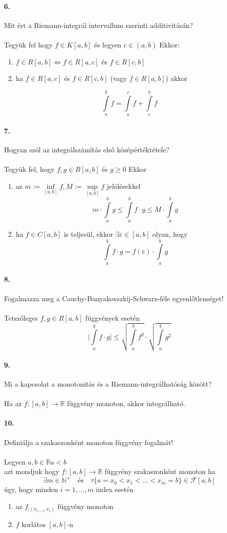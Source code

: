 \documentclass[10pt,a4paper]{article}
\newcommand{\R}{\mathbb{R}}
\renewcommand{\>}{\rightarrow}
\renewcommand{\r}{\tau}
\newcommand{\F}{\mathcal{F}}
\newcommand{\abi}{\int\limits_a^b}
\begin{document}
\paragraph{6. }
Mit ért a Riemann-integrál intervallum szerinti additivitásán?
\\\\
Tegyük fel hogy  $f \in K[a,b]$ és legyen $c\in (a,b)$ Ekkor:
\begin{enumerate}
\item $f \in R[a,b] \Leftrightarrow  f\in R[a,c]$ és $f\in R[c,b]$
\item ha $f\in R[a,c]$ és $f\in R[c,b]$ (vagy $f\in R[a,b]$) akkor 
\end{enumerate}
\[
\abi f = \int\limits_a^c f + \int\limits_c^b f 
\]
\paragraph{7. }
Hogyan szól az integrálszámítás első középértéktétele?
\\\\
Tegyük fel, hogy $f,g \in R[a,b]$ és $g\geq 0$
Ekkor 
\begin{enumerate}
\item az $m:= \inf\limits_{[a,b]} f, M:= \sup\limits_{[a,b]} f$ jelölésekkel 
\[
m\cdot \abi g \leq \abi f\cdot g \leq M \cdot \abi g
\]
\item ha $f\in C[a,b]$ is teljesül, ekkor $\exists \varepsilon \in [a,b]$ olyan, hogy 
\[
\abi f \cdot g = f(\varepsilon) \cdot \abi g
\]
\end{enumerate}
\paragraph{8. }
Fogalmazza meg a Cauchy-Bunyakovszkij-Schwarz-féle egyenlőtlenséget!
\\\\
Tetszőleges $f,g \in R[a,b]$ függvények esetén 
\[
\Bigg\lvert \abi f\cdot g \Bigg\lvert \leq \sqrt{\abi f^2} \cdot \sqrt{\abi g^2}
\] 
\paragraph{9. }Mi a kapcsolat a monotonitás és a Riemann-integrálhatóság között? \\\\
Ha az $f: [a,b] \> \R$ függvény monoton, akkor integrálható.
\paragraph{10. }
Definiálja a szakaszonként monoton függvény fogalmát! \\\\
Legyen $a,b\in \R a<b$ \\
azt mondjuk hogy $f:[a,b]\>\R$ függvény szakaszonként monoton ha 
\[
\exists m\in \mathbb{N}^+ \quad \text{és} \quad \r \{a=x_0<x_1< ...<x_m = b\} \in \F[a,b]
\]
úgy, hogy minden $i = 1,...,m$ index esetén
\begin{enumerate}
\item az $f_{\lvert (x_{i-1},x_i)}$ függvény monoton
\item $f$ korlátos $[a,b]$-n  
\end{enumerate}
\end{document}
